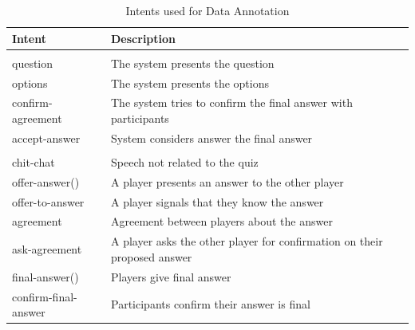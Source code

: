 \documentclass[hidelinks, 11pt]{article}
\begin{document}
\noindent
\begin{table}[h!]
  \begin{tabular}{ | p{2cm} | p{5cm} | }
    \hline
    \rowcolor[HTML]{BFD8EC}
    \textbf{Intent}      & \textbf{Description}                                                     \\
    \hline \hline
    \rowcolor[HTML]{DCE9F6}
    \multicolumn{2}{|c|}{\textit{Host (System) Intents}}                                            \\
    \hline
    question             & The system presents the question                                         \\
    \hline
    options              & The system presents the options                                          \\
    \hline
    confirm-agreement    & The system tries to confirm the final answer with participants           \\
    \hline
    accept-answer        & System considers answer the final answer                                 \\
    \hline \hline
    \rowcolor[HTML]{DCE9F6}
    \multicolumn{2}{|c|}{\textit{User Intents}}                                                     \\
    \hline
    chit-chat            & Speech not related to the quiz                                           \\
    \hline
    offer-answer()       & A player presents an answer to the other player                          \\
    \hline
    offer-to-answer      & A  player signals that they know the answer                              \\
    \hline
    agreement            & Agreement between players about the answer                               \\
    \hline
    ask-agreement        & A player asks the other player for confirmation on their proposed answer \\
    \hline
    final-answer()       & Players give final answer                                                \\
    \hline
    confirm-final-answer & Participants confirm their answer is final                               \\
    \hline
  \end{tabular}
  \caption{Intents used for Data Annotation}
  \label{table:intents}
\end{table}
\end{document}
